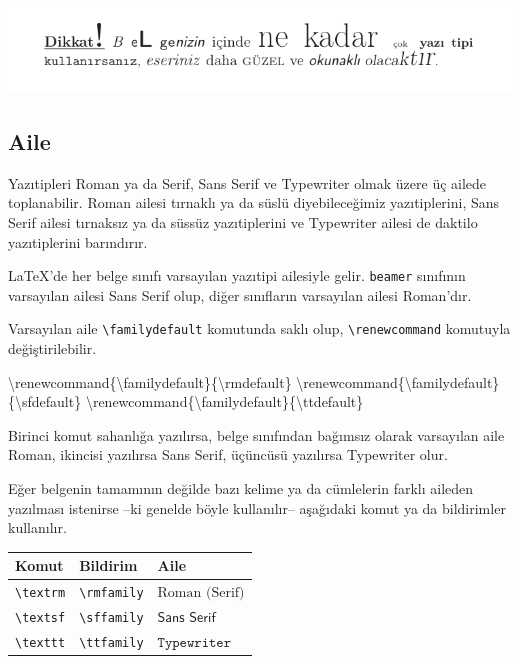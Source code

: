 \documentclass[
  letterpaper,
  DIV=11,
  numbers=noendperiod]{scrreprt}
\newenvironment{Shaded}{\begin{snugshade}}{\end{snugshade}}
\newcommand{\ExtensionTok}[1]{\textcolor[rgb]{0.00,0.23,0.31}{#1}}
\newcommand{\FunctionTok}[1]{\textcolor[rgb]{0.28,0.35,0.67}{#1}}
\newcommand{\NormalTok}[1]{\textcolor[rgb]{0.00,0.23,0.31}{#1}}
\begin{document}
\includegraphics[width=1\textwidth,height=\textheight]{./images/uyari.png}

\hypertarget{aile}{%
\subsection{Aile}\label{aile}}

Yazıtipleri Roman ya da Serif, Sans Serif ve Typewriter olmak üzere üç
ailede toplanabilir. Roman ailesi tırnaklı ya da süslü diyebileceğimiz
yazıtiplerini, Sans Serif ailesi tırnaksız ya da süssüz yazıtiplerini ve
Typewriter ailesi de daktilo yazıtiplerini barındırır.

{\LaTeX}'de her belge sınıfı varsayılan yazıtipi ailesiyle gelir.
\texttt{beamer} sınıfının varsayılan ailesi Sans Serif olup, diğer
sınıfların varsayılan ailesi Roman'dır.

Varsayılan aile \texttt{\textbackslash{}familydefault} komutunda saklı
olup, \texttt{\textbackslash{}renewcommand} komutuyla değiştirilebilir.

\begin{Shaded}
\begin{Highlighting}[]
\FunctionTok{\textbackslash{}renewcommand}\NormalTok{\{}\ExtensionTok{\textbackslash{}familydefault}\NormalTok{\}\{}\FunctionTok{\textbackslash{}rmdefault}\NormalTok{\}  }
\FunctionTok{\textbackslash{}renewcommand}\NormalTok{\{}\ExtensionTok{\textbackslash{}familydefault}\NormalTok{\}\{}\FunctionTok{\textbackslash{}sfdefault}\NormalTok{\}  }
\FunctionTok{\textbackslash{}renewcommand}\NormalTok{\{}\ExtensionTok{\textbackslash{}familydefault}\NormalTok{\}\{}\FunctionTok{\textbackslash{}ttdefault}\NormalTok{\} }
\end{Highlighting}
\end{Shaded}

Birinci komut sahanlığa yazılırsa, belge sınıfından bağımsız olarak
varsayılan aile Roman, ikincisi yazılırsa Sans Serif, üçüncüsü yazılırsa
Typewriter olur.

Eğer belgenin tamamının değilde bazı kelime ya da cümlelerin farklı
aileden yazılması istenirse --ki genelde böyle kullanılır-- aşağıdaki
komut ya da bildirimler kullanılır.

\begin{longtable}[]{@{}lll@{}}
\toprule()
Komut & Bildirim & Aile \\
\midrule()
\endhead
\texttt{\textbackslash{}textrm} & \texttt{\textbackslash{}rmfamily} &
\(\textrm{Roman (Serif)}\) \\
\texttt{\textbackslash{}textsf} & \texttt{\textbackslash{}sffamily} &
\(\textsf{Sans Serif}\) \\
\texttt{\textbackslash{}texttt} & \texttt{\textbackslash{}ttfamily} &
\(\texttt{Typewriter}\) \\
\bottomrule()
\end{longtable}
\end{document}
